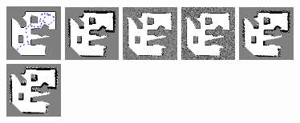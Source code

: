 \documentclass[letterpaper, 10 pt, conference]{ieeeconf} %
\begin{document}
\begin{figure}
  \includegraphics[width=0.16\textwidth]{../../Data/cave_player/gt-final.png}%
  \includegraphics[width=0.16\textwidth]{../../Data/cave_player/TwoAssumptionAlgo.png}%
  \includegraphics[width=0.16\textwidth]{../../Data/cave_player/SICKSlowMetropolis.png}%
  \includegraphics[width=0.16\textwidth]{../../Data/cave_player/SICKDDMCMC.png}%
  \includegraphics[width=0.16\textwidth]{../../Data/cave_player/run_belief_propagation.png}%
  \includegraphics[width=0.16\textwidth]{../../Data/cave_player/dualdecomposition.png}\\

\end{figure}
\end{document}

